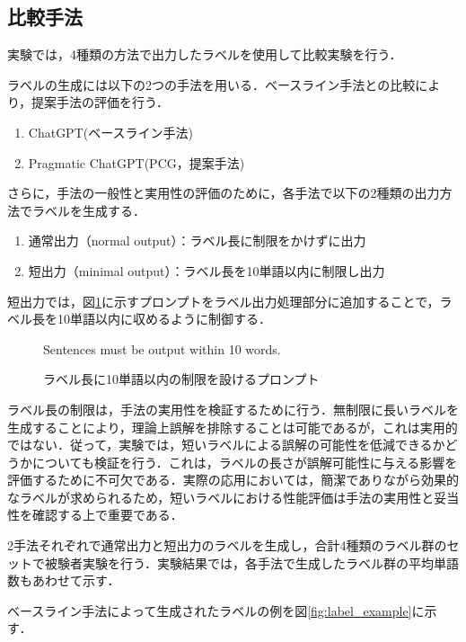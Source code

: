\documentclass[a4paper,11pt]{jreport}
\begin{document}
\subsection{比較手法}

実験では，4種類の方法で出力したラベルを使用して比較実験を行う．

ラベルの生成には以下の2つの手法を用いる．ベースライン手法との比較により，提案手法の評価を行う．
\begin{enumerate}
    \item ChatGPT(ベースライン手法)
    \item Pragmatic ChatGPT(PCG，提案手法)
\end{enumerate}

さらに，手法の一般性と実用性の評価のために，各手法で以下の2種類の出力方法でラベルを生成する．
\begin{enumerate}
  \item 通常出力（normal output）：ラベル長に制限をかけずに出力
  \item 短出力（minimal output）：ラベル長を10単語以内に制限し出力
\end{enumerate}

短出力では，図\ref{fig:limiting_prompt}に示すプロンプトをラベル出力処理部分に追加することで，ラベル長を10単語以内に収めるように制御する．

\begin{figure}[H]
\begin{mdframed}[linewidth=1pt]
Sentences must be output within 10 words.
\end{mdframed}
\caption{ラベル長に10単語以内の制限を設けるプロンプト}
\label{fig:limiting_prompt}
\end{figure}


ラベル長の制限は，手法の実用性を検証するために行う．無制限に長いラベルを生成することにより，理論上誤解を排除することは可能であるが，これは実用的ではない．従って，実験では，短いラベルによる誤解の可能性を低減できるかどうかについても検証を行う．これは，ラベルの長さが誤解可能性に与える影響を評価するために不可欠である．実際の応用においては，簡潔でありながら効果的なラベルが求められるため，短いラベルにおける性能評価は手法の実用性と妥当性を確認する上で重要である．

2手法それぞれで通常出力と短出力のラベルを生成し，合計4種類のラベル群のセットで被験者実験を行う．実験結果では，各手法で生成したラベル群の平均単語数もあわせて示す．

ベースライン手法によって生成されたラベルの例を図\ref{fig:label_example}に示す．
\end{document}
